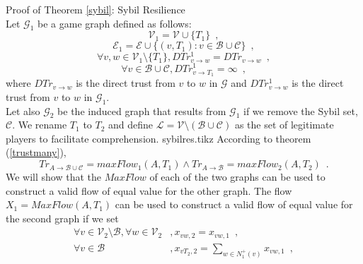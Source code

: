 \begin{sepproof}{Proof of Theorem \ref{sybil}: Sybil Resilience} \ \\
\label{sybilproof}
   Let $\mathcal{G}_1$ be a game graph defined as follows:
   \begin{equation*}
      \mathcal{V}_1 = \mathcal{V} \cup \{T_1\} \enspace,
   \end{equation*}
   \begin{equation*}
      \mathcal{E}_1 = \mathcal{E} \cup \{(v, T_1) : v \in \mathcal{B} \cup \mathcal{C}\} \enspace,
   \end{equation*}
   \begin{equation*}
      \forall v,w \in \mathcal{V}_1 \setminus \{T_1\}, DTr^1_{v \rightarrow w} = DTr_{v \rightarrow w} \enspace,
   \end{equation*}
   \begin{equation*}
      \forall v \in \mathcal{B} \cup \mathcal{C}, DTr^1_{v \rightarrow T_1} = \infty \enspace,
   \end{equation*}
   where $DTr_{v \rightarrow w}$ is the direct trust from $v$ to $w$ in $\mathcal{G}$ and $DTr^1_{v \rightarrow w}$ is
   the direct trust from $v$ to $w$ in $\mathcal{G}_1$. \\
   Let also $\mathcal{G}_2$ be the induced graph that results from $\mathcal{G}_1$ if we remove the Sybil set,
   $\mathcal{C}$. We rename $T_1$ to $T_2$ and define $\mathcal{L} = \mathcal{V} \setminus \left(\mathcal{B} \cup
   \mathcal{C}\right)$ as the set of legitimate players to facilitate comprehension.
   {sybilres.tikz}
   According to theorem (\ref{trustmany}),
   \begin{equation}
   \label{trmaxflow}
      Tr_{A \rightarrow \mathcal{B} \cup \mathcal{C}} = maxFlow_1\left(A, T_1\right) \wedge
      Tr_{A \rightarrow \mathcal{B}} = maxFlow_2\left(A, T_2\right) \enspace.
   \end{equation}
   We will show that the $MaxFlow$ of each of the two graphs can be used to construct a valid flow of equal value for the
   other graph. The flow $X_1 = MaxFlow\left(A, T_1\right)$ can be used to construct a valid flow of equal value for the
   second graph if we set
   \begin{align*}
      \forall v \in \mathcal{V}_2 \setminus \mathcal{B}, \forall w \in \mathcal{V}_2&, x_{vw,2} = x_{vw,1} \enspace, \\
      \forall v \in \mathcal{B}&, x_{vT_2,2} = \sum\limits_{w \in N^{+}_1\left(v\right)}x_{vw,1} \enspace, \\

\end{align*}
\end{sepproof}
